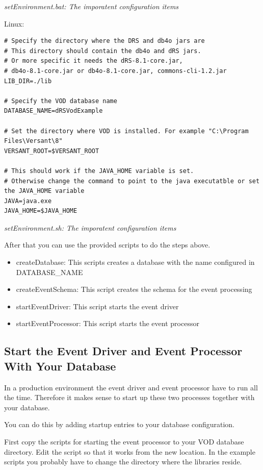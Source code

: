 {\small\itshape setEnvironment.bat: The imporatent configuration items\par}
\medskip

Linux:

\begin{lstlisting}
# Specify the directory where the DRS and db4o jars are
# This directory should contain the db4o and dRS jars.
# Or more specific it needs the dRS-8.1-core.jar, 
# db4o-8.1-core.jar or db4o-8.1-core.jar, commons-cli-1.2.jar
LIB_DIR=./lib

# Specify the VOD database name
DATABASE_NAME=dRSVodExample

# Set the directory where VOD is installed. For example "C:\Program Files\Versant\8"
VERSANT_ROOT=$VERSANT_ROOT

# This should work if the JAVA_HOME variable is set. 
# Otherwise change the command to point to the java executatble or set the JAVA_HOME variable
JAVA=java.exe
JAVA_HOME=$JAVA_HOME
\end{lstlisting}

{\small\itshape setEnvironment.sh: The imporatent configuration items\par}
\medskip

After that you can use the provided scripts to do the steps above.

\begin{itemize}
\item createDatabase: This scripts creates a database with the name configured in DATABASE\_NAME
\item createEventSchema: This script creates the schema for the event processing
\item startEventDriver: This script starts the event driver
\item startEventProcessor: This script starts the event processor
\end{itemize}

\subsection*{Start the Event Driver and Event Processor With Your Database}

In a production environment the event driver and event processor have to run all the time. Therefore it makes sense to start up these two processes together with your database.

You can do this by adding startup entries to your database configuration.

First copy the scripts for starting the event processor to your VOD database directory. Edit the script so that it works from the new location. In the example scripts you probably have to change the directory where the libraries reside.

